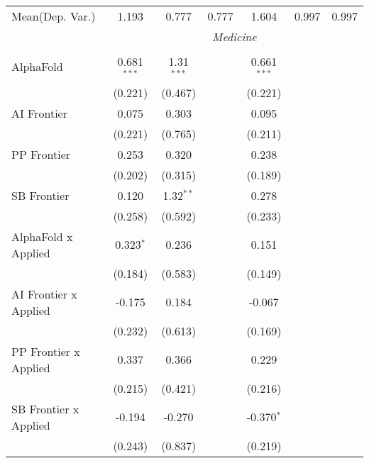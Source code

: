 \begin{tabular}{lcccccc}
Mean(Dep. Var.) & 1.193 & 0.777 & 0.777 & 1.604 & 0.997 & 0.997 \\
 & \multicolumn{6}{c}{\textit{Medicine}} \\ \\
   AlphaFold                      & 0.681$^{***}$ & 1.31$^{***}$ &               & 0.661$^{***}$ &        &   \\   
                                  & (0.221)       & (0.467)      &               & (0.221)       &        &   \\   
   AI Frontier                    & 0.075         & 0.303        &               & 0.095         &        &   \\   
                                  & (0.221)       & (0.765)      &               & (0.211)       &        &   \\   
   PP Frontier                    & 0.253         & 0.320        &               & 0.238         &        &   \\   
                                  & (0.202)       & (0.315)      &               & (0.189)       &        &   \\   
   SB Frontier                    & 0.120         & 1.32$^{**}$  &               & 0.278         &        &   \\   
                                  & (0.258)       & (0.592)      &               & (0.233)       &        &   \\   
   AlphaFold x Applied            & 0.323$^{*}$   & 0.236        &               & 0.151         &        &   \\   
                                  & (0.184)       & (0.583)      &               & (0.149)       &        &   \\   
   AI Frontier x Applied          & -0.175        & 0.184        &               & -0.067        &        &   \\   
                                  & (0.232)       & (0.613)      &               & (0.169)       &        &   \\   
   PP Frontier x Applied          & 0.337         & 0.366        &               & 0.229         &        &   \\   
                                  & (0.215)       & (0.421)      &               & (0.216)       &        &   \\   
   SB Frontier x Applied          & -0.194        & -0.270       &               & -0.370$^{*}$  &        &   \\   
                                  & (0.243)       & (0.837)      &               & (0.219)       &        &   \\   

\end{tabular}
